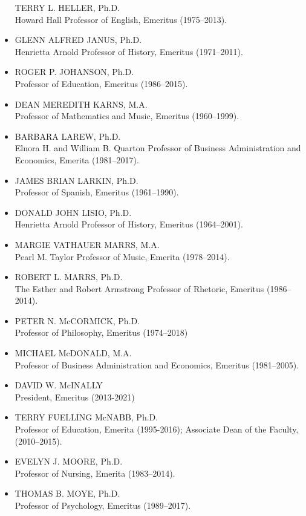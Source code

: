 \documentclass[
  letterpaper,
]{scrbook}
\begin{document}
\begin{itemize}
  TERRY L. HELLER, Ph.D.\\
  Howard Hall Professor of English, Emeritus (1975--2013).
\item
  GLENN ALFRED JANUS, Ph.D.\\
  Henrietta Arnold Professor of History, Emeritus (1971--2011).
\item
  ROGER P. JOHANSON, Ph.D.\\
  Professor of Education, Emeritus (1986--2015).
\item
  DEAN MEREDITH KARNS, M.A.\\
  Professor of Mathematics and Music, Emeritus (1960--1999).
\item
  BARBARA LAREW, Ph.D.\\
  Elnora H. and William B. Quarton Professor of Business Administration
  and Economics, Emerita (1981--2017).
\item
  JAMES BRIAN LARKIN, Ph.D.\\
  Professor of Spanish, Emeritus (1961--1990).
\item
  DONALD JOHN LISIO, Ph.D.\\
  Henrietta Arnold Professor of History, Emeritus (1964--2001).
\item
  MARGIE VATHAUER MARRS, M.A.\\
  Pearl M. Taylor Professor of Music, Emerita (1978--2014).
\item
  ROBERT L. MARRS, Ph.D.\\
  The Esther and Robert Armstrong Professor of Rhetoric, Emeritus
  (1986--2014).
\item
  PETER N. McCORMICK, Ph.D.\\
  Professor of Philosophy, Emeritus (1974--2018)
\item
  MICHAEL McDONALD, M.A.\\
  Professor of Business Administration and Economics, Emeritus
  (1981--2005).
\item
  DAVID W. McINALLY\\
  President, Emeritus (2013-2021)
\item
  TERRY FUELLING McNABB, Ph.D.\\
  Professor of Education, Emerita (1995-2016); Associate Dean of the
  Faculty, (2010--2015).
\item
  EVELYN J. MOORE, Ph.D.\\
  Professor of Nursing, Emerita (1983--2014).
\item
  THOMAS B. MOYE, Ph.D.\\
  Professor of Psychology, Emeritus (1989--2017).

\end{itemize}
\end{document}
